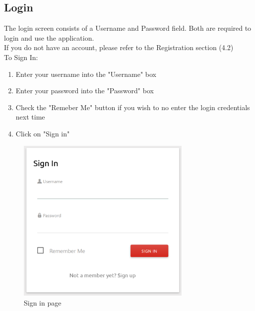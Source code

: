\documentclass[12pt]{article}
\begin{document}
\subsection{Login}
The login screen consists of a Username and Password field. Both are required to login and use the application. \\
If you do not have an account, please refer to the Registration section (4.2)\\
To Sign In:
\begin{enumerate}
\item Enter your username into the "Username" box
\item Enter your password into the "Password" box
\item Check the "Remeber Me" button if you wish to no enter the login credentials next time
\item Click on "Sign in"
\end{enumerate}

\begin{figure}[H]
\centering
\includegraphics[width=0.75\textwidth]{signin}
\caption{Sign in page}
\end{figure}
\end{document}
